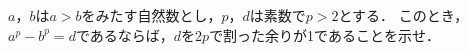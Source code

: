 \documentclass[../../main.tex]{subfiles}
\begin{document}
$a$，$b$は$a>b$をみたす自然数とし，$p$，$d$は素数で$p>2$とする．
このとき，$a^p-b^p=d$であるならば，$d$を$2p$で割った余りが1であることを示せ．
\end{document}
